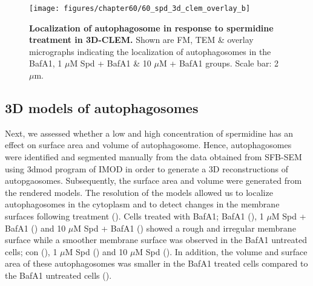 \begin{landscape}
\begin{figure}[!htbp]
\center
  \texttt{[image: figures/chapter60/60\_spd\_3d\_clem\_overlay\_b]}
  \caption[Localization of autophagosome in response to spermidine treatment in 3D-CLEM]{\textbf{Localization of autophagosome in response to spermidine treatment in 3D-CLEM.} Shown are FM, TEM \& overlay micrographs indicating the localization of autophagosomes in the BafA1, 1 $\mu$M Spd + BafA1 \& 10 $\mu$M + BafA1 groups. Scale bar: 2 $\mu$m.}
  \label{fig:60_spd_3d_clem_overlay_b}
\end{figure} 
\end{landscape}

\subsection{3D models of autophagosomes}
Next, we assessed whether a low and high concentration of spermidine has an effect on surface area and volume of autophagosome.  Hence, autophagosomes were identified and segmented manually from the data obtained from SFB-SEM using 3dmod program of IMOD \citep{Kremer1996} in order to generate a 3D reconstructions of autopgaosomes. Subsequently, the surface area and volume were generated from the rendered models. The resolution of the models allowed us to localize autophagosomes in the cytoplasm and to detect changes in the membrane surfaces following treatment (). Cells treated with BafA1; BafA1 (), 1 $\mu$M Spd + BafA1 () and 10 $\mu$M Spd + BafA1 () showed a rough and irregular membrane surface while a smoother membrane surface was observed in the BafA1 untreated cells; con (), 1 $\mu$M Spd () and 10 $\mu$M Spd (). In addition, the volume and surface area of these autophagosomes was smaller  in the BafA1 treated cells compared to the BafA1 untreated cells ().

